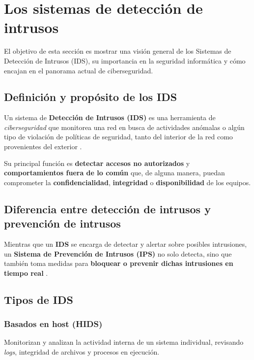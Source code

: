 \documentclass[11pt,a4paper,twoside]{report}
\begin{document}
\section{Los sistemas de detección de intrusos}

El objetivo de esta sección es mostrar una visión general de los Sistemas de Detección de Intrusos (IDS), su importancia en la seguridad informática y cómo encajan en el panorama actual de ciberseguridad.

\subsection{Definición y propósito de los IDS}

Un sistema de \textbf{Detección de Intrusos (IDS)} es una herramienta de \textit{ciberseguridad} que monitorea una red en busca de actividades anómalas o algún tipo de violación de políticas de seguridad, tanto del interior de la red como provenientes del exterior \cite{cichonski2012guide}.\newline

Su principal función es \textbf{detectar accesos no autorizados} y \textbf{comportamientos fuera de lo común} que, de alguna manera, puedan comprometer la \textbf{confidencialidad}, \textbf{integridad} o \textbf{disponibilidad} de los equipos.


\subsection{Diferencia entre detección de intrusos y prevención de intrusos}

Mientras que un \textbf{IDS} se encarga de detectar y alertar sobre posibles intrusiones, un \textbf{Sistema de Prevención de Intrusos (IPS)} no solo detecta, sino que también toma medidas para \textbf{bloquear o prevenir dichas intrusiones en tiempo real} \cite{abbas2023ids}.

\subsection{Tipos de IDS}

\subsubsection{Basados en host (HIDS)}

Monitorizan y analizan la actividad interna de un sistema individual, revisando \textit{logs}, integridad de archivos y procesos en ejecución.
\end{document}
